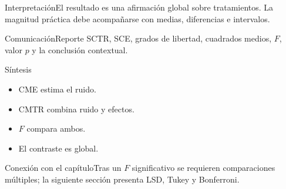 \documentclass[10pt,aspectratio=169]{beamer}
\begin{document}
\begin{frame}{Interpretación}\small El resultado es una afirmación global sobre tratamientos. La magnitud práctica debe acompañarse con medias, diferencias e intervalos.\end{frame}
\begin{frame}{Comunicación}\small Reporte SCTR, SCE, grados de libertad, cuadrados medios, $F$, valor $p$ y la conclusión contextual.\end{frame}
\begin{frame}{Síntesis}\small\begin{itemize}\item CME estima el ruido.\item CMTR combina ruido y efectos.\item $F$ compara ambos.\item El contraste es global.\end{itemize}\end{frame}
\begin{frame}{Conexión con el capítulo}\small Tras un $F$ significativo se requieren comparaciones múltiples; la siguiente sección presenta LSD, Tukey y Bonferroni.\end{frame}
\end{document}
